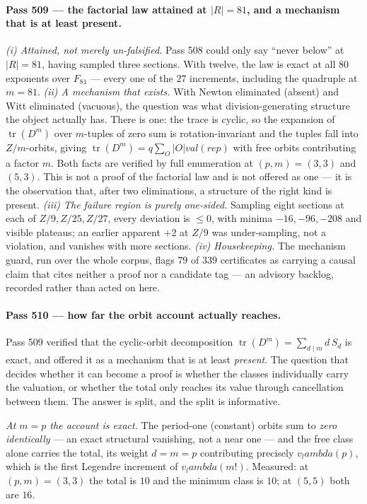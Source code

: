 \documentclass[12pt,a4paper]{article}
\def\mathbb#1{#1}%
\def\mathrm#1{#1}%
\def\textbf#1{#1}%
\def\text#1{#1}%
\def\lambda{lambda}%
\def\cdot{ }%
\theoremstyle{definition}
\newcommand{\FF}{\mathbb{F}}
\newcommand{\ZZ}{\mathbb{Z}}
\begin{document}
\paragraph{Pass 509 --- the factorial law attained at $|R|=81$, and a mechanism
that is at least present.}
\emph{(i) Attained, not merely un-falsified.}  Pass 508 could only say ``never
below'' at $|R|=81$, having sampled three sections.  With twelve, the law is
\textbf{exact at all $80$ exponents} over $\FF_{81}$ --- every one of the $27$
increments, including the quadruple at $m=81$.  \emph{(ii) A mechanism that
exists.}  With Newton eliminated (absent) and Witt eliminated (vacuous), the
question was what division-generating structure the object actually has.  There
is one: the trace is cyclic, so the expansion of $\operatorname{tr}(D^m)$ over
$m$-tuples of zero sum is rotation-invariant and the tuples fall into
$\ZZ/m$-orbits, giving
$\operatorname{tr}(D^m)=q\sum_O|O|\cdot\mathrm{val}(\text{rep})$ with free
orbits contributing a factor $m$.  Both facts are verified by full enumeration
at $(p,m)=(3,3)$ and $(5,3)$.  \textbf{This is not a proof of the factorial law
and is not offered as one} --- it is the observation that, after two
eliminations, a structure of the right kind is present.  \emph{(iii) The
failure region is purely one-sided.}  Sampling eight sections at each of
$\ZZ/9,\ZZ/25,\ZZ/27$, every deviation is $\le0$, with minima $-16,-96,-208$
and visible plateaus; an earlier apparent $+2$ at $\ZZ/9$ was under-sampling,
not a violation, and vanishes with more sections.  \emph{(iv) Housekeeping.}
The mechanism guard, run over the whole corpus, flags $79$ of $339$
certificates as carrying a causal claim that cites neither a proof nor a
candidate tag --- an advisory backlog, recorded rather than acted on here.

\paragraph{Pass 510 --- how far the orbit account actually reaches.}
Pass 509 verified that the cyclic-orbit decomposition
$\operatorname{tr}(D^m)=\sum_{d\mid m}d\,S_d$ is exact, and offered it as a
mechanism that is at least \emph{present}.  The question that decides whether
it can become a proof is whether the classes individually carry the valuation,
or whether the total only reaches its value through cancellation between them.
The answer is split, and the split is informative.

\emph{At $m=p$ the account is exact.}  The period-one (constant) orbits sum to
\emph{zero identically} --- an exact structural vanishing, not a near one ---
and the free class alone carries the total, its weight $d=m=p$ contributing
precisely $v_\lambda(p)$, which is the first Legendre increment of
$v_\lambda(m!)$.  Measured: at $(p,m)=(3,3)$ the total is $10$ and the minimum
class is $10$; at $(5,5)$ both are $16$.
\end{document}
